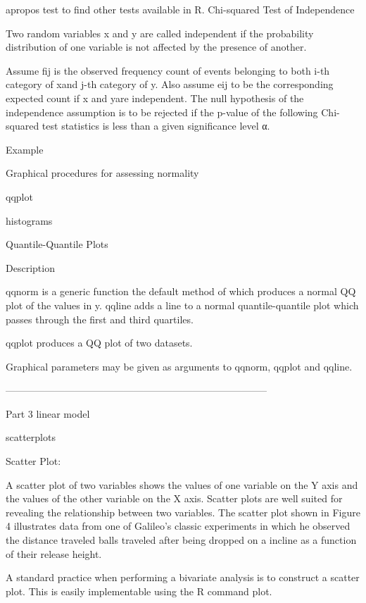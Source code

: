 apropos test to find other tests available in R. Chi-squared Test of Independence

Two random variables x and y are called independent if the probability distribution of one variable is not affected by the presence of another.

Assume fij is the observed frequency count of events belonging to both i-th category of xand j-th category of y. Also assume eij to be the corresponding expected count if x and yare independent. The null hypothesis of the independence assumption is to be rejected if the p-value of the following Chi-squared test statistics is less than a given significance level α.



Example

 Graphical procedures for assessing normality

qqplot

histograms


Quantile-Quantile Plots

Description

qqnorm is a generic function the default method of which produces a normal QQ plot of the values in y. qqline adds a line to a normal quantile-quantile plot which passes through the first and third quartiles.

qqplot produces a QQ plot of two datasets.

Graphical parameters may be given as arguments to qqnorm, qqplot and qqline.



--------------------------------------------------------------------------------


Part 3 linear model

scatterplots


Scatter Plot:

 A scatter plot of two variables shows the values of one variable on the Y axis and the values of the other variable on the X axis. Scatter plots are well suited for revealing the relationship between two variables. The scatter plot shown in Figure 4 illustrates data from one of Galileo's classic experiments in which he observed the distance traveled balls traveled after being dropped on a incline as a function of their release height.



A standard practice when performing a bivariate analysis is to construct a scatter plot. This is easily implementable using the R command plot.

